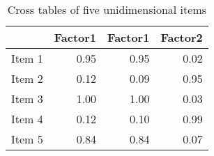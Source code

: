 \begin{table}[ht]
\centering
\begin{tabular}{rrrr}
  \toprule
 & Factor1 & Factor1 & Factor2 \\ 
  \midrule
Item 1 & 0.95 & 0.95 & 0.02 \\ 
  Item 2 & 0.12 & 0.09 & 0.95 \\ 
  Item 3 & 1.00 & 1.00 & 0.03 \\ 
  Item 4 & 0.12 & 0.10 & 0.99 \\ 
  Item 5 & 0.84 & 0.84 & 0.07 \\ 
   \bottomrule
\end{tabular}
\caption{Cross tables of five unidimensional items} 
\label{tab:fa1b}
\end{table}
